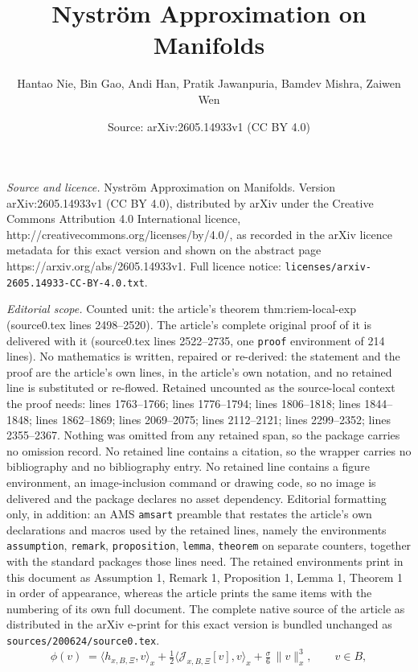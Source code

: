 \documentclass[10pt,a4paper]{amsart}
\title{Nystr\"om Approximation on Manifolds}
\author{Hantao Nie, Bin Gao, Andi Han, Pratik Jawanpuria, Bamdev Mishra, Zaiwen Wen}
\date{Source: arXiv:2605.14933v1 (CC BY 4.0)}
\begin{document}
\maketitle

\noindent\emph{Source and licence.} Nystr\"om Approximation on Manifolds. Version arXiv:2605.14933v1 (CC BY 4.0), distributed by arXiv under the Creative Commons Attribution 4.0 International licence, http://creativecommons.org/licenses/by/4.0/, as recorded in the arXiv licence metadata for this exact version and shown on the abstract page https://arxiv.org/abs/2605.14933v1. Full licence notice: \texttt{licenses/arxiv-2605.14933-CC-BY-4.0.txt}.\par\smallskip

\noindent\textit{Editorial scope.} Counted unit: the article's theorem thm:riem-local-exp (source0.tex lines 2498--2520). The article's complete original proof of it is delivered with it (source0.tex lines 2522--2735, one \texttt{proof} environment of 214 lines). No mathematics is written, repaired or re-derived: the statement and the proof are the article's own lines, in the article's own notation, and no retained line is substituted or re-flowed.  Retained uncounted as the source-local context the proof needs: lines 1763--1766; lines 1776--1794; lines 1806--1818; lines 1844--1848; lines 1862--1869; lines 2069--2075; lines 2112--2121; lines 2299--2352; lines 2355--2367.  Nothing was omitted from any retained span, so the package carries no omission record.  No retained line contains a citation, so the wrapper carries no bibliography and no bibliography entry.  No retained line contains a figure environment, an image-inclusion command or drawing code, so no image is delivered and the package declares no asset dependency.  Editorial formatting only, in addition: an AMS \texttt{amsart} preamble that restates the article's own declarations and macros used by the retained lines, namely the environments \texttt{assumption}, \texttt{remark}, \texttt{proposition}, \texttt{lemma}, \texttt{theorem} on separate counters, together with the standard packages those lines need.  The retained environments print in this document as Assumption 1, Remark 1, Proposition 1, Lemma 1, Theorem 1 in order of appearance, whereas the article prints the same items with the numbering of its own full document.  The complete native source of the article as distributed in the arXiv e-print for this exact version is bundled unchanged as \texttt{sources/200624/source0.tex}.
\begin{equation}
\label{eq:cubic-model}
\phi(v)\;=\langle h_{x, B, \Xi}, v\rangle_x + \tfrac{1}{2}\langle \mathcal{J}_{x, B, \Xi} [v], v\rangle_x + \tfrac{\sigma}{6}\,\|v\|_x^{3},\qquad v\in B,
\end{equation}
\end{document}
